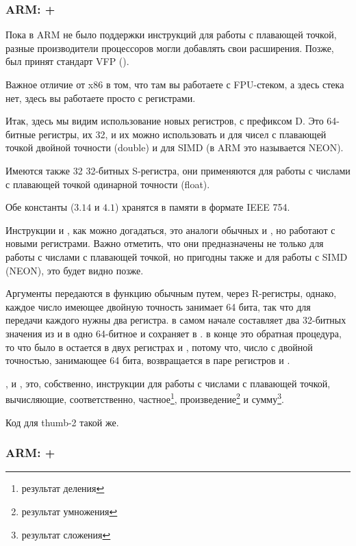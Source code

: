﻿\subsubsection{ARM: \OptimizingXcode + \ARMMode}

Пока в ARM не было поддержки инструкций для работы с плавающей точкой, разные производители процессоров
могли добавлять свои расширения. Позже, был принят стандарт VFP ().

Важное отличие от x86 в том, что там вы работаете с FPU-стеком, а здесь стека нет, 
здесь вы работаете просто с регистрами.



Итак, здесь мы видим использование новых регистров, с префиксом D. 
Это 64-битные регистры, их 32, и их можно
использовать и для чисел с плавающей точкой двойной точности (double) и для SIMD (в ARM это называется NEON).

Имеются также 32 32-битных S-регистра, они применяются для работы с числами с плавающей точкой одинарной точности
(float).

Обе константы ($3.14$ и $4.1$) хранятся в памяти в формате IEEE 754.

Инструкции  и , как можно догадаться, это аналоги обычных  и \MOV, 
но работают с новыми регистрами.
Важно отметить, что они предназначены не только для работы с числами с плавающей точкой, но пригодны также и для
работы с SIMD (NEON), это будет видно позже.

Аргументы передаются в функцию обычным путем, через R-регистры, однако, каждое число имеющее двойную точность
занимает 64 бита, так что для передачи каждого нужны два регистра. 
 в самом начале
составляет два 32-битных значения из \Rzero и \Rone в одно 64-битное и сохраняет в . 
 в конце это обратная процедура, то что было в  
остается в двух регистрах \Rzero и \Rone,
потому что, число с двойной точностью, занимающее 64 бита, возвращается в паре регистров \Rzero и \Rone.

,  и , это, собственно, инструкции для работы с числами с плавающей точкой, 
вычисляющие, соответственно, частное\footnote{результат деления}, 
произведение\footnote{результат умножения} и сумму\footnote{результат сложения}.

Код для thumb-2 такой же.

\subsubsection{ARM: \OptimizingKeil + \ThumbMode}


